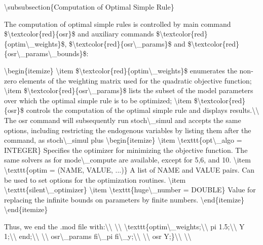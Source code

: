\documentclass[10pt,math=newtx,citestyle=gb7714-2015,bibstyle=gb7714-2015]{elegantbook}
\begin{document}
	\textbackslash{}subsubsection\{Computation of Optimal Simple Rule\}
	
	The computation of optimal simple rules is controlled by main command \$\textbackslash{}textcolor\{red\}\{osr\}\$ and auxiliary commands \$\textbackslash{}textcolor\{red\}\{optim\textbackslash{}\_weights\}\$, \$\textbackslash{}textcolor\{red\}\{osr\textbackslash{}\_params\}\$ and \$\textbackslash{}textcolor\{red\}\{osr\textbackslash{}\_params\textbackslash{}\_bounds\}\$:
	
	\textbackslash{}begin\{itemize\}
	\textbackslash{}item \$\textbackslash{}textcolor\{red\}\{optim\textbackslash{}\_weights\}\$ enumerates the non-zero elements of the weighting matrix used for the quadratic objective function;
	\textbackslash{}item \$\textbackslash{}textcolor\{red\}\{osr\textbackslash{}\_params\}\$ lists the subset of the model parameters over which the optimal simple rule is to be optimized;
	\textbackslash{}item \$\textbackslash{}textcolor\{red\}\{osr\}\$ controls the computation of the optimal simple rule and displays results.\textbackslash{}\textbackslash{}
	The osr command will subsequently run stoch\textbackslash{}\_simul and accepts the same options, including restricting the endogenous variables by listing them after the command, as stoch\textbackslash{}\_simul plus
	\textbackslash{}begin\{itemize\}
	\textbackslash{}item \textbackslash{}texttt\{opt\textbackslash{}\_algo = INTEGER\} Specifies the optimizer for minimizing the objective function. The same solvers as for mode\textbackslash{}\_compute are available, except for 5,6, and 10.
	\textbackslash{}item \textbackslash{}texttt\{optim = (NAME, VALUE, ...)\} A list of NAME and VALUE pairs. Can be used to set options for the optimization routines.
	\textbackslash{}item \textbackslash{}texttt\{silent\textbackslash{}\_optimizer\}
	\textbackslash{}item \textbackslash{}texttt\{huge\textbackslash{}\_number = DOUBLE\} Value for replacing the infinite bounds on parameters by finite numbers.
	\textbackslash{}end\{itemize\}
	\textbackslash{}end\{itemize\}
	
	Thus, we end the .mod file with:\textbackslash{}\textbackslash{}
	\textbackslash{}\textbackslash{}
	\textbackslash{}texttt\{optim\textbackslash{}\_weights;\textbackslash{}\textbackslash{}
	pi 1.5;\textbackslash{}\textbackslash{}
	Y 1;\textbackslash{}\textbackslash{}
	end;\textbackslash{}\textbackslash{}
	\textbackslash{}\textbackslash{}
	osr\textbackslash{}\_params fi\textbackslash{}\_pi fi\textbackslash{}\_y;\textbackslash{}\textbackslash{}
	\textbackslash{}\textbackslash{}
	osr Y;\}\textbackslash{}\textbackslash{}
	\textbackslash{}\textbackslash{}
	
\end{document}
